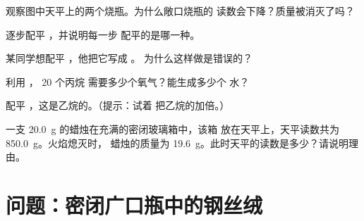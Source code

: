 \begin{exercise}[$\star\star$]\label{exo:g8:balanced-equations:7}
观察图中天平上的两个烧瓶。为什么敞口烧瓶的
读数会下降？质量被消灭了吗？
\end{exercise}

\begin{exercise}[$\star\star$]\label{exo:g8:balanced-equations:8}
逐步配平 ，并说明每一步 %
配平的是哪一种。
\end{exercise}

\begin{exercise}[$\star\star$]\label{exo:g8:balanced-equations:9}
某同学想配平 ，他把它写成 。 %
为什么这样做是错误的？
\end{exercise}

\begin{exercise}[$\star\star$]\label{exo:g8:balanced-equations:10}
利用 ， 20 个丙烷
需要多少个氧气？能生成多少个
水？
\end{exercise}

\begin{exercise}[$\star\star\star$]\label{exo:g8:balanced-equations:11}
配平 ，这是乙烷的。（提示：试着 %
把乙烷的加倍。）
\end{exercise}

\begin{exercise}[$\star\star\star$]\label{exo:g8:balanced-equations:12}
一支 \qty{20.0}{g} 的蜡烛在充满的密闭玻璃箱中，该箱
放在天平上，天平读数共为 \qty{850.0}{g}。火焰熄灭时，
蜡烛的质量为 \qty{19.6}{g}。此时天平的读数是多少？请说明理由。
\end{exercise}

\section{问题：密闭广口瓶中的钢丝绒}

